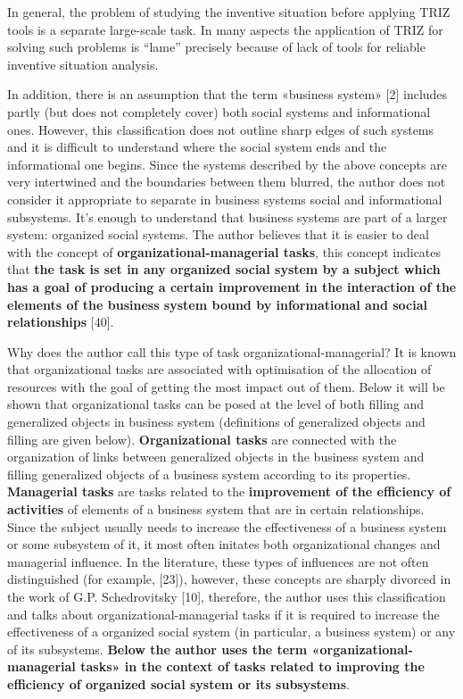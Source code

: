 \documentclass[11pt,a4paper]{book}
\begin{document}
In general, the problem of studying the inventive situation before applying
TRIZ tools is a separate large-scale task. In many aspects the application of
TRIZ for solving such problems is “lame” precisely because of lack of tools
for reliable inventive situation analysis.

In addition, there is an assumption that the term «business system» [2]
includes partly (but does not completely cover) both social systems and
informational ones.  However, this classification does not outline sharp edges
of such systems and it is difficult to understand where the social system ends
and the informational one begins. Since the systems described by the above
concepts are very intertwined and the boundaries between them blurred, the
author does not consider it appropriate to separate in business systems social
and informational subsystems.  It’s enough to understand that business systems
are part of a larger system: organized social systems.  The author believes
that it is easier to deal with the concept of
\textbf{organizational-managerial tasks}, this concept indicates that
\textbf{the task is set in any organized social system by a subject which has
  a goal of producing a certain improvement in the interaction of the elements
  of the business system bound by informational and social relationships}
       [40].

Why does the author call this type of task organizational-managerial?  It is
known that organizational tasks are associated with optimisation of the
allocation of resources with the goal of getting the most impact out of them.
Below it will be shown that organizational tasks can be posed at the level of
both filling and generalized objects in business system (definitions of
generalized objects and filling are given below). \textbf{Organizational
  tasks} are connected with the organization of links between generalized
objects in the business system and filling generalized objects of a business
system according to its properties.  \textbf{Managerial tasks} are tasks
related to the \textbf{improvement of the efficiency of activities} of
elements of a business system that are in certain relationships. Since the
subject usually needs to increase the effectiveness of a business system or
some subsystem of it, it most often initates both organizational changes and
managerial influence.  In the literature, these types of influences are not
often distinguished (for example, [23]), however, these concepts are sharply
divorced in the work of G.P. Schedrovitsky [10], therefore, the author uses
this classification and talks about organizational-managerial tasks if it is
required to increase the effectiveness of a organized social system (in
particular, a business system) or any of its subsystems. \textbf{Below the
  author uses the term «organizational-managerial tasks» in the context of
  tasks related to improving the efficiency of organized social system or its
  subsystems}.
\end{document}
